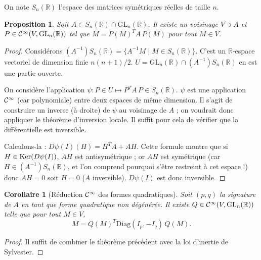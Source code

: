 \documentclass[a4paper, 11pt]{article}
\def\R{\mathbb{R}}
\def\Cf{{\cal{C}}}
\def\Ker{\textnormal{Ker}}
\def\GL{\mathrm{GL}}
\def\Diag{\mathrm{Diag}}
\newtheorem*{proposition}{Proposition}
\newtheorem*{corollary}{Corollaire}
\begin{document}
On note $S_n(\R)$ l'espace des matrices symétriques réelles de taille $n$.

\begin{proposition}
  Soit $A \in S_n(\R) \cap \GL_n(\R)$. Il existe un voisinage $V \ni A$ et $P
  \in \Cf^\infty(V, \GL_n(\R))$ tel que $M = P(M)^T A \, P(M)$ pour
  tout $M \in V$.
\end{proposition}

\begin{proof}
  Considérons $(A^{-1})S_n(\R) = \{A^{-1}M \mid M \in S_n(\R)\}$. C'est un
  $\R$-espace vectoriel de dimension finie $n(n+1)/2$. $U = \GL_n(\R) \cap
  (A^{-1})S_n(\R)$ en est une partie ouverte.
  
  On considère l'application $\psi : P \in U \mapsto P^T A \, P \in S_n(\R)$.
  $\psi$ est une application $\Cf^\infty$ (car polynomiale) entre deux espaces
  de même dimension. Il s'agit de construire un inverse (à droite) de $\psi$ au
  voisinage de $A$ ; on voudrait donc appliquer le théorème d'inversion locale.
  Il suffit pour cela de vérifier que la différentielle est inversible.

  Calculons-la : $D\psi(I)(H) = H^TA + AH$. Cette formule montre que si $H \in
  \Ker(D\psi(I))$, $AH$ est antisymétrique ; or $AH$ est symétrique (car $H \in
  (A^{-1})S_n(\R)$, et l'on comprend pourquoi s'être restreint à cet espace !)
  donc $AH = 0$ soit $H = 0$ ($A$ inversible). $D\psi(I)$ est donc inversible.
\end{proof}

\begin{corollary}[Réduction $\Cf^\infty$ des formes quadratiques]
  Soit $(p,q)$ la signature de $A$ en tant que forme quadratique non dégénérée.
  Il existe $Q \in \Cf^\infty(V, \GL_n(\R))$ telle que pour tout $M \in V$,
  \[M = Q(M)^T \Diag(I_p, -I_q)\, Q(M). \]
\end{corollary}
\begin{proof}
  Il suffit de combiner le théorème précédent avec la loi d'inertie de
  Sylvester.
\end{proof}
\end{document}
